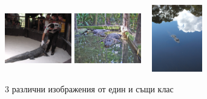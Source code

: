 \begin{figure}[H]
\centering
\includegraphics[width=110px,height=110px]{Figures/alig1.JPEG}
\includegraphics[width=110px,height=110px]{Figures/alig2.JPEG}
\includegraphics[width=110px,height=110px]{Figures/alig3.JPEG}
\caption{3 различни изображения от един и същи клас}
\label{fig:different_images}
\end{figure}






